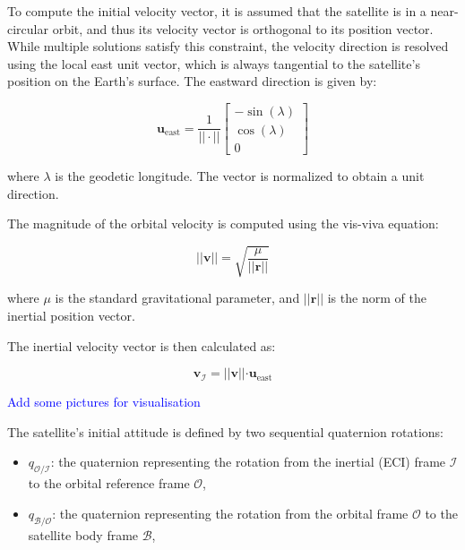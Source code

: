 To compute the initial velocity vector, it is assumed that the satellite is in a near-circular orbit, and thus its velocity vector is orthogonal to its position vector. While multiple solutions satisfy this constraint, the velocity direction is resolved using the local east unit vector, which is always tangential to the satellite’s position on the Earth's surface. The eastward direction is given by:

\begin{equation}
    \mathbf{u}_{\text{east}} = \frac{1}{|| \cdot ||} \begin{bmatrix}
        -\sin(\lambda) \\
        \cos(\lambda) \\
        0
    \end{bmatrix}
\end{equation}

where \( \lambda \) is the geodetic longitude. The vector is normalized to obtain a unit direction.

The magnitude of the orbital velocity is computed using the vis-viva equation:

\begin{equation}
    \left|| \mathbf{v} \right|| = \sqrt{\frac{\mu}{\left|| \mathbf{r} \right||}}
\end{equation}

where \( \mu \) is the standard gravitational parameter, and \( \left|| \mathbf{r} \right|| \) is the norm of the inertial position vector.

The inertial velocity vector is then calculated as:

\begin{equation}
    \mathbf{v}_\mathcal{I} = \left|| \mathbf{v} \right|| \cdot \mathbf{u}_{\text{east}}
\end{equation}

\textcolor{blue}{Add some pictures for visualisation}


The satellite's initial attitude is defined by two sequential quaternion rotations:

\begin{itemize}
    \item \( q_{\mathcal{O}/\mathcal{I}} \): the quaternion representing the rotation from the inertial (ECI) frame \( \mathcal{I} \) to the orbital reference frame \( \mathcal{O} \),
    \item \( q_{\mathcal{B}/\mathcal{O}} \): the quaternion representing the rotation from the orbital frame \( \mathcal{O} \) to the satellite body frame \( \mathcal{B} \),
\end{itemize}

